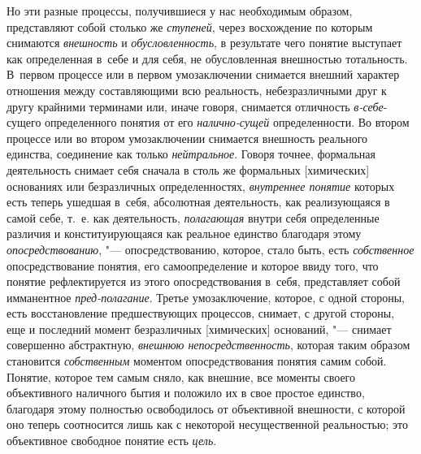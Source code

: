 Но эти разные процессы, получившиеся у нас необходимым
образом, представляют собой столько же
{\em ступеней}, через
восхождение по которым снимаются
{\em внешность} и
{\em обусловленность}, в
результате чего понятие выступает как определенная в~себе и для себя, не
обусловленная внешностью тотальность. В~первом процессе или в первом
умозаключении снимается внешний характер отношения между составляющими всю
реальность, небезразличными друг к другу крайними терминами или, иначе
говоря, снимается отличность
{\em в-себе}-сущего
определенного понятия от его
{\em налично-сущей}
определенности. Во втором процессе или во втором
умозаключении снимается внешность реального единства, соединение как только
{\em нейтральное}. Говоря
точнее, формальная деятельность снимает себя сначала в столь же формальных
[химических] основаниях или безразличных определенностях,
{\em внутреннее понятие}
которых есть теперь ушедшая в~себя, абсолютная деятельность,
как реализующаяся в самой себе, т.~е. как деятельность,
{\em полагающая} внутри
себя определенные различия и конституирующаяся как реальное единство
благодаря этому {\em опосредствованию},
"--- опосредствованию, которое, стало быть, есть
{\em собственное}
опосредствование понятия, его самоопределение и которое ввиду
того, что понятие рефлектируется из этого опосредствования в~себя,
представляет собой имманентное
{\em пред-полагание}.
Третье умозаключение, которое, с одной стороны, есть
восстановление предшествующих процессов, снимает, с другой стороны, еще и
последний момент безразличных [химических] оснований, "---
снимает совершенно абстрактную,
{\em внешнюю непосредственность},
которая таким образом становится
{\em собственным}
моментом опосредствования понятия самим собой. Понятие,
которое тем самым сняло, как внешние, все моменты своего объективного
наличного бытия и положило их в свое простое единство, благодаря этому
полностью освободилось от объективной внешности, с которой оно теперь
соотносится лишь как с некоторой несущественной реальностью; это
объективное свободное понятие есть
{\em цель}.

